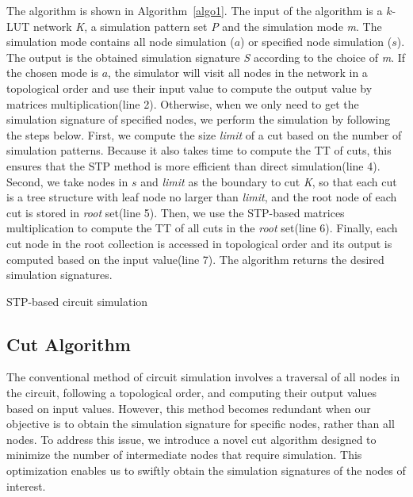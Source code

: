 \documentclass[conference]{IEEEtran}
\begin{document}
The algorithm is shown in Algorithm~\ref{algo1}.
The input of the algorithm is a $k$-LUT network \emph{K}, a simulation pattern set \emph{P} and the simulation mode \emph{m}.
The simulation mode contains all node simulation ($a$) or specified node simulation ($s$).
The output is the obtained simulation signature \emph{S} according to the choice of \emph{m}.
If the chosen mode is $a$, the simulator will visit all nodes in the network in a topological order and use their input value to compute the output value by matrices multiplication(line 2).
Otherwise, when we only need to get the simulation signature of specified nodes, we perform the simulation by following the steps below.
First, we compute the size \emph{limit} of a cut based on the number of simulation patterns.
Because it also takes time to compute the TT of cuts, this ensures that the STP method is more efficient than direct simulation(line 4).
Second, we take nodes in $s$ and \emph{limit} as the boundary to cut \emph{K}, so that each cut is a tree structure with leaf node no larger than \emph{limit}, and the root node of each cut is stored in \emph{root} set(line 5).
Then, we use the STP-based matrices multiplication to compute the TT of all cuts in the \emph{root} set(line 6).
Finally, each cut node in the root collection is accessed in topological order and its output is computed based on the input value(line 7).
The algorithm returns the desired simulation signatures.

\begin{algorithm}[t]\footnotesize
  \SetAlgoLined
  \LinesNumbered %
  \caption{STP-based circuit simulation}
  \label{algo1}
\end{algorithm}

\subsection{Cut Algorithm}
\label{sec33}
The conventional method of circuit simulation involves a traversal of all nodes in the circuit, following a topological order, and computing their output values based on input values. 
However, this method becomes redundant when our objective is to obtain the simulation signature for specific nodes, rather than all nodes.
To address this issue, we introduce a novel cut algorithm designed to minimize the number of intermediate nodes that require simulation. 
This optimization enables us to swiftly obtain the simulation signatures of the nodes of interest.
\end{document}
